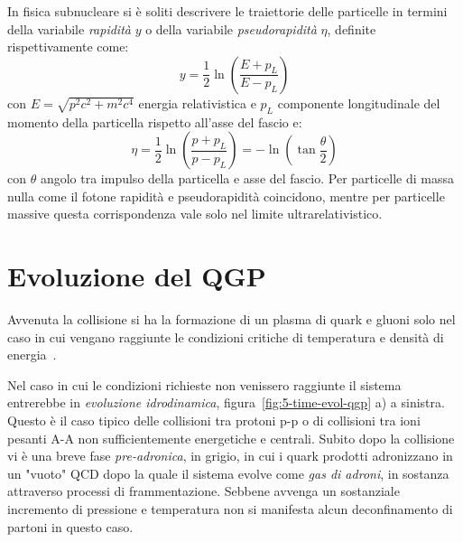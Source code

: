          In fisica subnucleare si è soliti descrivere le traiettorie delle particelle in termini della variabile \textit{rapidità} $y$ o della variabile \textit{pseudorapidità} $\eta$, definite rispettivamente come:
         \begin{equation*}
             y = \frac{1}{2} \ln(\frac{E + p_L}{E - p_L})
         \end{equation*}
        con $E = \sqrt{p^2 c^2 + m^2 c^4}$ energia relativistica e $p_L$ componente longitudinale del momento della particella rispetto all'asse del fascio e:
        \begin{equation*}
            \eta = \frac{1}{2} \ln(\frac{p + p_L}{p - p_L}) = - \ln(\tan{\frac{\theta}{2}})
        \end{equation*}
        con $\theta$ angolo tra impulso della particella e asse del fascio. Per particelle di massa nulla come il fotone rapidità e pseudorapidità coincidono, mentre per particelle massive questa corrispondenza vale solo nel limite ultrarelativistico.

\section{Evoluzione del QGP}
    Avvenuta la collisione si ha la formazione di un plasma di quark e gluoni solo nel caso in cui vengano raggiunte le condizioni critiche di temperatura e densità di energia~\cite{Andronic_2014}.
    
    Nel caso in cui le condizioni richieste non venissero raggiunte il sistema entrerebbe in \textit{evoluzione idrodinamica}, figura~\ref{fig:5-time-evol-qgp} a) a sinistra. Questo è il caso tipico delle collisioni tra protoni p-p o di collisioni tra ioni pesanti A-A non sufficientemente energetiche e centrali. Subito dopo la collisione vi è una breve fase \textit{pre-adronica}, in grigio, in cui i quark prodotti adronizzano in un "vuoto" QCD dopo la quale il sistema evolve come \textit{gas di adroni}, in sostanza attraverso processi di frammentazione. Sebbene avvenga un sostanziale incremento di pressione e temperatura non si manifesta alcun deconfinamento di partoni in questo caso.

